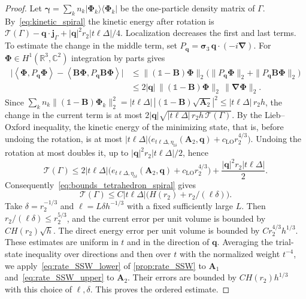 \documentclass[final,reqno]{amsart}
\theoremstyle{remark}
\renewcommand{\le}{\leqslant}
\newcommand{\RR}{\mathbb{R}}
\newcommand{\CC}{\mathbb{C}}
\newcommand{\LO}{\mathrm{LO}}
\newcommand{\pscal}[1]{\left\langle #1 \right\rangle}
\newcommand{\iden}{\mathbb{1}}
\newcommand{\grad}{\bm{\nabla}}
\newcommand{\tetra}{\mathbb{\Delta}}
\newcommand{\TC}{\mathcal{T}}
\begin{document}
\begin{proof}
Let $\bm{\gamma}=\sum_kn_k|\bm{\Phi}_k\rangle\langle\bm{\Phi}_k|$ be the one-particle density matrix of $\Gamma$. By~\cref{eq:kinetic_spiral} the kinetic energy after rotation is $\TC(\Gamma)-\mathbf{q}\cdot\mathbf{j}_\Gamma+|\mathbf{q}|^2r_2|t\ell\tetra|/4$. Localization decreases the first and last terms. To estimate the change in the middle term, set $P_{\mathbf{q}}=\bm{\sigma}_3\,\mathbf{q}\cdot(-i\grad)$. For $\bm{\Phi}\in H^1(\RR^3,\CC^2)$ integration by parts gives
\begin{align*}
\big|\pscal{\bm{\Phi},P_{\mathbf{q}}\bm{\Phi}}-\pscal{\mathbf{B}\bm{\Phi},P_{\mathbf{q}}\mathbf{B}\bm{\Phi}}\big|
&\le\|(\iden-\mathbf{B})\bm{\Phi}\|_2\big(\|P_{\mathbf{q}}\bm{\Phi}\|_2+\|P_{\mathbf{q}}\mathbf{B}\bm{\Phi}\|_2\big)\\
&\le 2|\mathbf{q}|\,\|(\iden-\mathbf{B})\bm{\Phi}\|_2\,\|\grad\bm{\Phi}\|_2 .
\end{align*}
Since $\sum_kn_k\|(\iden-\mathbf{B})\bm{\Phi}_k\|_2^2=|t\ell\tetra|\,|(\iden-\mathbf{B})\sqrt{\mathbf{A}_2}|^2\le|t\ell\tetra|\,r_2h$, the change in the current term is at most $2|\mathbf{q}|\sqrt{|t\ell\tetra|\,r_2h\,\TC(\Gamma)}$. By the Lieb--Oxford inequality, the kinetic energy of the minimizing state, that is, before undoing the rotation, is at most $|t\ell\tetra|\big(e_{t\ell\tetra,\eta_{t\delta}}(\mathbf{A}_2,\mathbf{q})+c_\LO r_2^{4/3}\big)$. Undoing the rotation at most doubles it, up to $|\mathbf{q}|^2r_2|t\ell\tetra|/2$, hence
$$
\TC(\Gamma)\le2|t\ell\tetra|\big(e_{t\ell\tetra,\eta_{t\delta}}(\mathbf{A}_2,\mathbf{q})+c_\LO r_2^{4/3}\big)+\frac{|\mathbf{q}|^2r_2|t\ell\tetra|}{2}.
$$
Consequently~\cref{eq:bounds_tetrahedron_spiral} gives
$$
\TC(\Gamma)\le C|t\ell\tetra|\big(H(r_2)+r_2/(\ell\delta)\big).
$$
Take $\delta=r_2^{-1/3}$ and $\ell=L\delta h^{-1/3}$ with a fixed sufficiently large $L$. Then $r_2/(\ell\delta)\le r_2^{5/3}$, and the current error per unit volume is bounded by $C H(r_2)\sqrt h$. The direct energy error per unit volume is bounded by $Cr_2^{4/3}h^{1/3}$. These estimates are uniform in $t$ and in the direction of $\mathbf{q}$. Averaging the trial-state inequality over directions and then over $t$ with the normalized weight $t^{-4}$, we apply~\cref{eq:rate_SSW_lower} of \cref{prop:rate_SSW} to $\mathbf{A}_1$ and~\cref{eq:rate_SSW_upper} to $\mathbf{A}_2$. Their errors are bounded by $C H(r_2)h^{1/3}$ with this choice of $\ell,\delta$. This proves the ordered estimate.


\end{proof}
\end{document}
